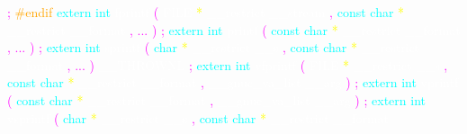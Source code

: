 \textcolor{magenta}{;} 
\textcolor{orange}{\#endif} 
\textcolor{cyan}{extern} 
\textcolor{cyan}{int} 
\textcolor{white}{fprintf} 
\textcolor{magenta}{(} 
\textcolor{white}{FILE} 
\textcolor{yellow}{*} 
\textcolor{white}{\_\_restrict} 
\textcolor{white}{\_\_stream} 
\textcolor{magenta}{,} 
\textcolor{cyan}{const} 
\textcolor{cyan}{char} 
\textcolor{yellow}{*} 
\textcolor{white}{\_\_restrict} 
\textcolor{white}{\_\_format} 
\textcolor{magenta}{,} 
\textcolor{magenta}{...} 
\textcolor{magenta}{)} 
\textcolor{magenta}{;} 
\textcolor{cyan}{extern} 
\textcolor{cyan}{int} 
\textcolor{white}{printf} 
\textcolor{magenta}{(} 
\textcolor{cyan}{const} 
\textcolor{cyan}{char} 
\textcolor{yellow}{*} 
\textcolor{white}{\_\_restrict} 
\textcolor{white}{\_\_format} 
\textcolor{magenta}{,} 
\textcolor{magenta}{...} 
\textcolor{magenta}{)} 
\textcolor{magenta}{;} 
\textcolor{cyan}{extern} 
\textcolor{cyan}{int} 
\textcolor{white}{sprintf} 
\textcolor{magenta}{(} 
\textcolor{cyan}{char} 
\textcolor{yellow}{*} 
\textcolor{white}{\_\_restrict} 
\textcolor{white}{\_\_s} 
\textcolor{magenta}{,} 
\textcolor{cyan}{const} 
\textcolor{cyan}{char} 
\textcolor{yellow}{*} 
\textcolor{white}{\_\_restrict} 
\textcolor{white}{\_\_format} 
\textcolor{magenta}{,} 
\textcolor{magenta}{...} 
\textcolor{magenta}{)} 
\textcolor{white}{\_\_THROWNL} 
\textcolor{magenta}{;} 
\textcolor{cyan}{extern} 
\textcolor{cyan}{int} 
\textcolor{white}{vfprintf} 
\textcolor{magenta}{(} 
\textcolor{white}{FILE} 
\textcolor{yellow}{*} 
\textcolor{white}{\_\_restrict} 
\textcolor{white}{\_\_s} 
\textcolor{magenta}{,} 
\textcolor{cyan}{const} 
\textcolor{cyan}{char} 
\textcolor{yellow}{*} 
\textcolor{white}{\_\_restrict} 
\textcolor{white}{\_\_format} 
\textcolor{magenta}{,} 
\textcolor{white}{\_\_gnuc\_va\_list} 
\textcolor{white}{\_\_arg} 
\textcolor{magenta}{)} 
\textcolor{magenta}{;} 
\textcolor{cyan}{extern} 
\textcolor{cyan}{int} 
\textcolor{white}{vprintf} 
\textcolor{magenta}{(} 
\textcolor{cyan}{const} 
\textcolor{cyan}{char} 
\textcolor{yellow}{*} 
\textcolor{white}{\_\_restrict} 
\textcolor{white}{\_\_format} 
\textcolor{magenta}{,} 
\textcolor{white}{\_\_gnuc\_va\_list} 
\textcolor{white}{\_\_arg} 
\textcolor{magenta}{)} 
\textcolor{magenta}{;} 
\textcolor{cyan}{extern} 
\textcolor{cyan}{int} 
\textcolor{white}{vsprintf} 
\textcolor{magenta}{(} 
\textcolor{cyan}{char} 
\textcolor{yellow}{*} 
\textcolor{white}{\_\_restrict} 
\textcolor{white}{\_\_s} 
\textcolor{magenta}{,} 
\textcolor{cyan}{const} 
\textcolor{cyan}{char} 
\textcolor{yellow}{*} 
\textcolor{white}{\_\_restrict} 
\textcolor{white}{\_\_format} 
